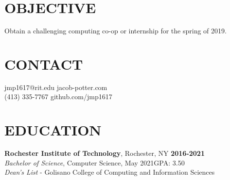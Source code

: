 \documentclass[line,margin]{res}
\begin{document}
\begin{resume}

\section{OBJECTIVE}
Obtain a challenging computing co-op or internship for the spring of 2019.

\section{CONTACT}
{jmp1617@rit.edu}\hfill 
{jacob-potter.com}\\
(413) 335-7767\hfill 
{github.com/jmp1617}

\section{EDUCATION}
\textbf{Rochester Institute of Technology}, Rochester, NY\hfill
    \textbf{2016-2021}\\
{\sl Bachelor of Science}, Computer Science, May 2021\hfill GPA: 3.50
\\
{\sl Dean's List} - Golisano College of Computing and Information Sciences


\end{resume}
\end{document}
